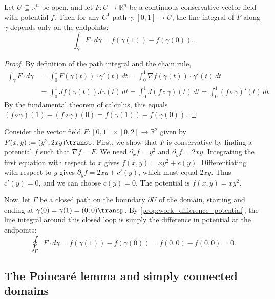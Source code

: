 \begin{proposition}
\label{prop:work_difference_potential}
Let $U \subseteq \mathbb{R}^n$ be open, and let $F : U \to \mathbb{R}^n$ be a continuous conservative vector field with potential $f$. Then for any $C^1$ path $\gamma : [0,1] \to U$, the line integral of $F$ along $\gamma$ depends only on the endpoints:
\[\int_\gamma F \cdot d\gamma = f(\gamma(1)) - f(\gamma(0)).\]
\end{proposition}
\begin{proof}
By definition of the path integral and the chain rule,
\begin{align*}
\int_\gamma F \cdot d\gamma &= \int_0^1 F(\gamma(t)) \cdot \gamma'(t) \,dt = \int_0^1 \nabla f(\gamma(t)) \cdot \gamma'(t) \,dt \\
&= \int_0^1 Jf(\gamma(t)) J\gamma(t) \,dt = \int_0^1 J(f \circ \gamma)(t) \,dt = \int_0^1 (f \circ \gamma)'(t) \,dt.
\end{align*}
By the fundamental theorem of calculus, this equals $(f \circ \gamma)(1) - (f \circ \gamma)(0) = f(\gamma(1)) - f(\gamma(0))$.
\end{proof}

\begin{example}
\label{ex:conservative_field_integral}
Consider the vector field $F : [0,1] \times [0,2] \to \mathbb{R}^2$ given by $F(x,y) := (y^2, 2xy)\transp$.
First, we show that $F$ is conservative by finding a potential $f$ such that $\nabla f = F$. We need $\partial_x f = y^2$ and $\partial_y f = 2xy$. Integrating the first equation with respect to $x$ gives $f(x,y) = xy^2 + c(y)$. Differentiating with respect to $y$ gives $\partial_y f = 2xy + c'(y)$, which must equal $2xy$. Thus $c'(y) = 0$, and we can choose $c(y) = 0$. The potential is $f(x,y) = xy^2$.

Now, let $\Gamma$ be a closed path on the boundary $\partial U$ of the domain, starting and ending at $\gamma(0) = \gamma(1) = (0,0)\transp$. By \cref{prop:work_difference_potential}, the line integral around this closed loop is simply the difference in potential at the endpoints:
\[\oint_\Gamma F \cdot d\gamma = f(\gamma(1)) - f(\gamma(0)) = f(0,0) - f(0,0) = 0.\]
\end{example}

\subsection{The Poincaré lemma and simply connected domains}
\label{sec:poincare_lemma_simply_connected}

